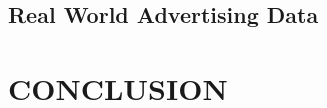 \documentclass[twoside]{article}
\newtheorem{lemma}{Lemma}
\DeclareMathOperator*{\vecspan}{span}
\DeclareMathOperator*{\tr}{tr}
\newcommand{\Wave}{{\mathcal{\hat W}^{ave}}}
\newcommand{\V}{\mathcal{V}}
\newcommand{\x}{\mathbf{x}}
\newcommand{\w}{\theta}
\newcommand{\wmle}{\hat\w^{mle}}
\newcommand{\ltwo}[1]{{\left\lVert {#1} \right\rVert}}
\newcommand{\proj}[1]{\pi_{{#1}}}
\newcommand{\prob}[1]{\Pr\left[{#1}\right]}
\newcommand{\ignore}[1]{}
\begin{document}
\subsection{Real World Advertising Data}

\section{CONCLUSION}






\ignore{
\newpage
\section*{Appendix: Proof of Lemma \ref{lem:normaff}}


Define $\V$ to be the vector space spanned by the first $m-1$ columns of $\Wave$.
That is, $\V=\vecspan\{\wmle_i\}_{i=1}^{m-1}$.
We have that
\begin{align}
\ltwo{\w-\proj{\Wave}\w}
&\le \ltwo{\w - \proj{\Wave}\proj{\V}\w}
\\
& \le \ltwo{\w - \proj{\V}\w} + \ltwo{\proj{\V}\w - \proj{\Wave}\proj{\V}\w}
\end{align}
The first inequality follows by the definition of $\proj\Wave\w$ as the point in $\Wave$ with minimum distance to $\w$,
and the second follows by the triangle inequality.
We will bound each of these terms separately.

}
\end{document}
